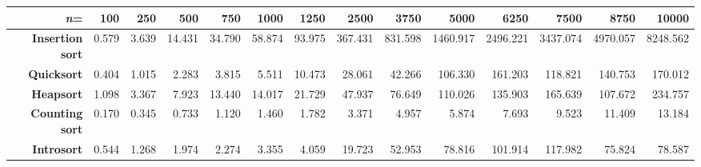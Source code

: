 \begin{tabular}{rrrrrrrrrrrrrr}
\hline
             \textbf{\emph{n}=} &   \textbf{100} &   \textbf{250} &   \textbf{500} &   \textbf{750} &   \textbf{1000} &   \textbf{1250} &   \textbf{2500} &   \textbf{3750} &   \textbf{5000} &   \textbf{6250} &   \textbf{7500} &   \textbf{8750} &   \textbf{10000} \\
\hline
 \textbf{Insertion sort} &          0.579 &          3.639 &         14.431 &         34.790 &          58.874 &          93.975 &         367.431 &         831.598 &        1460.917 &        2496.221 &        3437.074 &        4970.057 &         8248.562 \\
      \textbf{Quicksort} &          0.404 &          1.015 &          2.283 &          3.815 &           5.511 &          10.473 &          28.061 &          42.266 &         106.330 &         161.203 &         118.821 &         140.753 &          170.012 \\
       \textbf{Heapsort} &          1.098 &          3.367 &          7.923 &         13.440 &          14.017 &          21.729 &          47.937 &          76.649 &         110.026 &         135.903 &         165.639 &         107.672 &          234.757 \\
  \textbf{Counting sort} &          0.170 &          0.345 &          0.733 &          1.120 &           1.460 &           1.782 &           3.371 &           4.957 &           5.874 &           7.693 &           9.523 &          11.409 &           13.184 \\
      \textbf{Introsort} &          0.544 &          1.268 &          1.974 &          2.274 &           3.355 &           4.059 &          19.723 &          52.953 &          78.816 &         101.914 &         117.982 &          75.824 &           78.587 \\
\hline
\end{tabular}